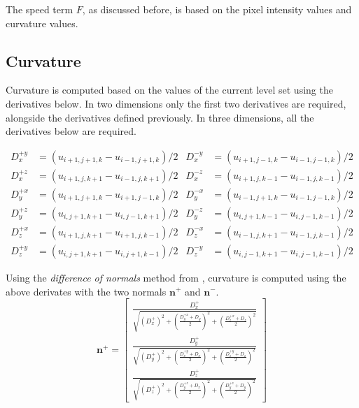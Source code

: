 The speed term $F$, as discussed before, is based on the pixel intensity values and curvature values. 

\subsection{Curvature}
Curvature is computed based on the values of the current level set using the derivatives below. In two dimensions only the first two derivatives are required, alongside the derivatives defined previously. In three dimensions, all the derivatives below are required.

\begin{align}
	D_x^{+y} &= (u_{i+1,j+1,k}-u_{i-1,j+1,k})/2 & 	D_x^{-y} &= (u_{i+1,j-1,k}-u_{i-1,j-1,k})/2 \nonumber\\
	D_x^{+z} &= (u_{i+1,j,k+1}-u_{i-1,j,k+1})/2 &   D_x^{-z} &= (u_{i+1,j,k-1}-u_{i-1,j,k-1})/2 \nonumber\\
	D_y^{+x} &= (u_{i+1,j+1,k}-u_{i+1,j-1,k})/2 & 	D_y^{-x} &= (u_{i-1,j+1,k}-u_{i-1,j-1,k})/2 \nonumber\\
	D_y^{+z} &= (u_{i,j+1,k+1}-u_{i,j-1,k+1})/2 &	  D_y^{-z} &= (u_{i,j+1,k-1}-u_{i,j-1,k-1})/2 \nonumber\\
	D_z^{+x} &= (u_{i+1,j,k+1}-u_{i+1,j,k-1})/2 & 	D_z^{-x} &= (u_{i-1,j,k+1}-u_{i-1,j,k-1})/2 \nonumber\\
	D_z^{+y} &= (u_{i,j+1,k+1}-u_{i,j+1,k-1})/2 &	  D_z^{-y} &= (u_{i,j-1,k+1}-u_{i,j-1,k-1})/2 \nonumber
\end{align}

Using the \textit{difference of normals} method from \cite{Lefohn04astreaming}, curvature is computed using the above derivates with the two normals $\textbf{n}^+$ and $\textbf{n}^-$.\\
\begin{equation}
\textbf{n}^+ = \left[
  \begin{array}{ c }
     \frac{D_x^+}{\sqrt{(D_x^+)^2 + {\left(\frac{D_y^{+x}+D_y}{2}\right)}^2 +{\left(\frac{D_z^{+x}+D_z}{2}\right)}^2  }}  \\[2em]
     \frac{D_y^+}{\sqrt{(D_y^+)^2 + {\left(\frac{D_x^{+y}+D_x}{2}\right)}^2 +{\left(\frac{D_z^{+y}+D_z}{2}\right)}^2  }}  \\[2em]
     \frac{D_z^+}{\sqrt{(D_z^+)^2 + {\left(\frac{D_y^{+z}+D_x}{2}\right)}^2 +{\left(\frac{D_y^{+z}+D_y}{2}\right)}^2  }}  
  \end{array} \right] 
\label{eq:nplus}
\end{equation}

